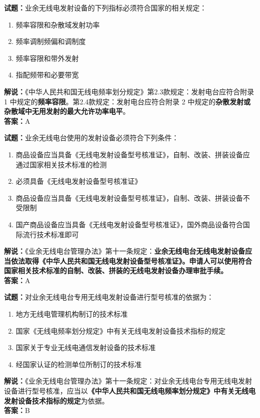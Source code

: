 \documentclass{ctexbook}
\begin{document}
\vspace{\baselineskip}

\noindent\textbf{试题：}业余无线电发射设备的下列指标必须符合国家的相关规定：
\begin{enumerate}[leftmargin=3em]
  \item 频率容限和杂散域发射功率
  \item 频率调制频偏和调制度
  \item 频率容限和带外发射
  \item 指配频带和必要带宽
\end{enumerate}
\noindent\textbf{解说：}《中华人民共和国无线电频率划分规定》第2.3款规定：发射电台应符合附录 1 中规定的\textbf{频率容限}。第2.4款规定：发射电台应符合附录 2 中规定的\textbf{杂散发射或杂散域中无用发射的最大允许功率电平}。\\\noindent\textbf{答案：}A

\vspace{\baselineskip}

\noindent\textbf{试题：}业余无线电台使用的发射设备必须符合下列条件：
\begin{enumerate}[leftmargin=3em]
  \item 商品设备应当具备《无线电发射设备型号核准证》，自制、改装、拼装设备应通过国家相关技术标准的检测
  \item 必须具备《无线电发射设备型号核准证》
  \item 商品设备应当具备《无线电发射设备型号核准证》，自制、改装、拼装设备不受限制
  \item 国产商品设备应当具备《无线电发射设备型号核准证》，国外商品设备符合国际流行技术标准即可
\end{enumerate}
\noindent\textbf{解说：}《业余无线电台管理办法》第十一条规定：\textbf{业余无线电台无线电发射设备应当依法取得《中华人民共和国无线电发射设备型号核准证》。申请人可以使用符合国家相关技术标准的自制、改装、拼装的无线电发射设备办理审批手续。}\\\noindent\textbf{答案：}A

\vspace{\baselineskip}

\noindent\textbf{试题：}对业余无线电台专用无线电发射设备进行型号核准的依据为：
\begin{enumerate}[leftmargin=3em]
  \item 地方无线电管理机构制订的技术标准
  \item 国家《无线电频率划分规定》中有关无线电发射设备技术指标的规定
  \item 国家关于专业无线电通信发射设备的技术标准
  \item 经国家认证的检测单位所制订的技术标准
\end{enumerate}
\noindent\textbf{解说：}《业余无线电台管理办法》第十一条规定：对业余无线电台专用无线电发射设备进行型号核准，应当以\textbf{《中华人民共和国无线电频率划分规定》中有关无线电发射设备技术指标的规定}为依据。\\\noindent\textbf{答案：}B
\end{document}
